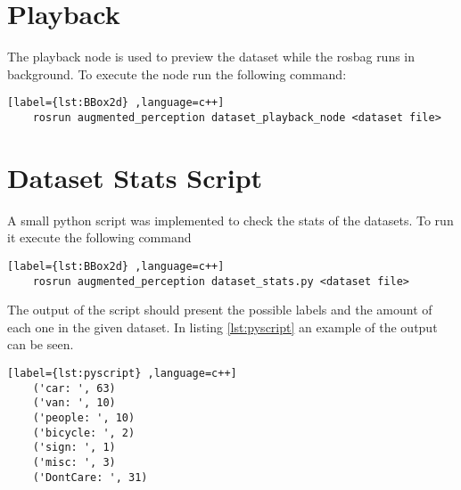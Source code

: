 \section{Playback}

The playback node is used to preview the dataset while the rosbag runs in background. To execute the node run the following command: 

\begin{center}
	\begin{lstlisting}[label={lst:BBox2d} ,language=c++]
	rosrun augmented_perception dataset_playback_node <dataset file>\end{lstlisting}
\end{center}


\section{Dataset Stats Script}

A small python script was implemented to check the stats of the datasets. To run it execute the following command 

\begin{center}
	\begin{lstlisting}[label={lst:BBox2d} ,language=c++]
	rosrun augmented_perception dataset_stats.py <dataset file>\end{lstlisting}
\end{center}

The output of the script should present the possible labels and the amount of each one in the given dataset. In listing \ref{lst:pyscript} an example of the output can be seen.

\begin{center}
	\begin{lstlisting}[label={lst:pyscript} ,language=c++]
	('car: ', 63)
	('van: ', 10)
	('people: ', 10)
	('bicycle: ', 2)
	('sign: ', 1)
	('misc: ', 3)
	('DontCare: ', 31)\end{lstlisting}
\end{center}
